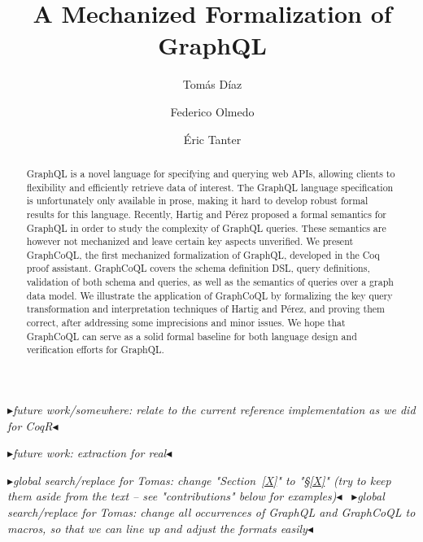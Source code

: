 \documentclass[sigplan,10pt,anonymous,review,nonacm]{acmart}
\newcommand{\mynote}[3]
    {{\color{#3} \fbox{\bfseries\sffamily\scriptsize#1}
    {\small$\blacktriangleright$\textsf{\emph{#2}}$\blacktriangleleft$}}~}
\newcommand{\et}[1]{\mynote{ET}{#1}{purple}}
\begin{document}
\title{A Mechanized Formalization of GraphQL}
\author{Tomás Díaz}

\author{Federico Olmedo}
\author{Éric Tanter}

\begin{abstract}
GraphQL is a novel language for specifying and querying web APIs, allowing clients to flexibility and efficiently retrieve data of interest. The GraphQL language specification is unfortunately only available in prose, making it hard to develop robust formal results for this language. Recently, Hartig and Pérez proposed a formal semantics for GraphQL in order to study the complexity of GraphQL queries. These semantics are however not mechanized and leave certain key aspects unverified. We present GraphCoQL, the first mechanized formalization of GraphQL, developed in the Coq proof assistant.  GraphCoQL covers the schema definition DSL, query definitions, validation of both schema and queries, as well as the semantics of queries over a graph data model.
We illustrate the application of GraphCoQL by formalizing the key query transformation and interpretation techniques of Hartig and Pérez, and proving them correct, after addressing some imprecisions and minor issues. 
We hope that GraphCoQL can serve as a solid formal baseline for both language design and verification efforts for GraphQL.
\end{abstract}


\maketitle


\et{future work/somewhere: relate to the current reference implementation as we did for CoqR}

\et{future work: extraction for real}

\et{global search/replace for Tomas: change "Section~\ref{X}" to "\S\ref{X}" (try to keep them aside from the text -- see "contributions" below for examples)}
\et{global search/replace for Tomas: change all occurrences of GraphQL and GraphCoQL to macros, so that we can line up and adjust the formats easily}
\end{document}
